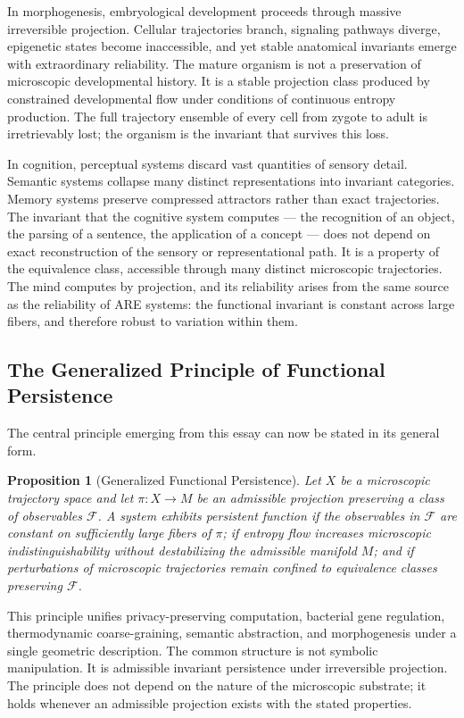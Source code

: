\documentclass[12pt, a4paper]{article}
\theoremstyle{essaystyle}
\newtheorem{proposition}{Proposition}
\begin{document}
In morphogenesis, embryological development proceeds through massive irreversible
projection. Cellular trajectories branch, signaling pathways diverge, epigenetic states
become inaccessible, and yet stable anatomical invariants emerge with extraordinary
reliability. The mature organism is not a preservation of microscopic developmental
history. It is a stable projection class produced by constrained developmental flow
under conditions of continuous entropy production. The full trajectory ensemble of every
cell from zygote to adult is irretrievably lost; the organism is the invariant that
survives this loss.

In cognition, perceptual systems discard vast quantities of sensory detail. Semantic
systems collapse many distinct representations into invariant categories. Memory systems
preserve compressed attractors rather than exact trajectories. The invariant that the
cognitive system computes --- the recognition of an object, the parsing of a sentence,
the application of a concept --- does not depend on exact reconstruction of the sensory
or representational path. It is a property of the equivalence class, accessible through
many distinct microscopic trajectories. The mind computes by projection, and its
reliability arises from the same source as the reliability of ARE systems: the
functional invariant is constant across large fibers, and therefore robust to variation
within them.

\subsection{The Generalized Principle of Functional Persistence}

The central principle emerging from this essay can now be stated in its general form.

\begin{proposition}[Generalized Functional Persistence]
Let $X$ be a microscopic trajectory space and let $\pi : X \to M$ be an admissible
projection preserving a class of observables $\mathcal{F}$. A system exhibits
persistent function if the observables in $\mathcal{F}$ are constant on sufficiently
large fibers of $\pi$; if entropy flow increases microscopic indistinguishability
without destabilizing the admissible manifold $M$; and if perturbations of microscopic
trajectories remain confined to equivalence classes preserving $\mathcal{F}$.
\end{proposition}

This principle unifies privacy-preserving computation, bacterial gene regulation,
thermodynamic coarse-graining, semantic abstraction, and morphogenesis under a single
geometric description. The common structure is not symbolic manipulation. It is
admissible invariant persistence under irreversible projection. The principle does not
depend on the nature of the microscopic substrate; it holds whenever an admissible
projection exists with the stated properties.
\end{document}
